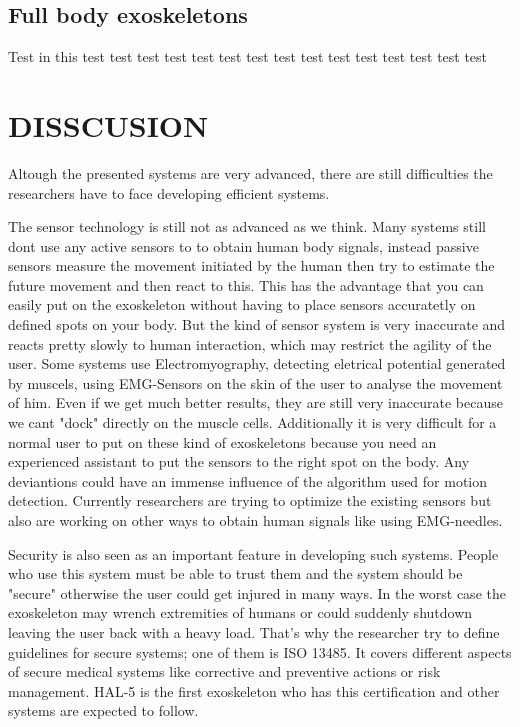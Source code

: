 \documentclass[letterpaper, 10 pt, conference]{ieeeconf}  %
\begin{document}
\subsection{Full body exoskeletons}
 
Test in this test test test test test test test 
test test test test test test test test\newpage

\section{DISSCUSION}

Altough the presented systems are very advanced, there are still difficulties the researchers have to face developing efficient systems. 


The sensor technology is still not as advanced as we think. Many systems still dont use any active sensors to to obtain human body signals, instead passive sensors measure the movement initiated by the human then try to estimate the future movement and then react to this. This has the advantage that you can easily put on the exoskeleton without having to place sensors accuratetly on defined spots on your body. But the kind of sensor system is very inaccurate and reacts pretty slowly to human interaction, which may restrict the agility of the user. Some systems use Electromyography, detecting eletrical potential generated by muscels, using EMG-Sensors on the skin of the user to analyse the movement of him. Even if we get much better results, they are still very inaccurate because we cant "dock" directly on the muscle cells. Additionally it is very difficult for a normal user to put on these kind of exoskeletons because you need an experienced assistant to put the sensors to the right spot on the body. Any deviantions could have an immense influence of the algorithm used for motion detection. Currently researchers are trying to optimize the existing sensors but also are working on other ways to obtain human signals like using EMG-needles.


Security is also seen as an important feature in developing such systems. People who use this system must be able to trust them and the system should be "secure" otherwise the user could get injured in many ways. In the worst case the exoskeleton may wrench extremities of humans or could suddenly shutdown leaving the user back with a heavy load. That's why the researcher try to define guidelines for secure systems; one of them is ISO 13485. It covers different aspects of secure medical systems like corrective and preventive actions or risk management. HAL-5 is the first exoskeleton who has this certification and other systems are expected to follow.
\end{document}
